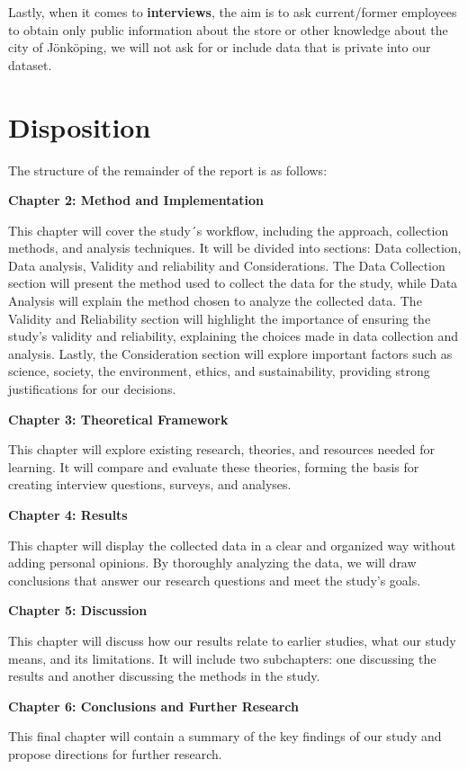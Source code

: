 Lastly, when it comes to \textbf{interviews}, the aim is to ask current/former employees to obtain only public information about the store or other knowledge about the city of Jönköping, we will not ask for or include data that is private into our dataset. 

\section{Disposition}
The structure of the remainder of the report is as follows: 

\textbf{Chapter 2: Method and Implementation}

This chapter will cover the study´s workflow, including the approach, collection methods, and analysis techniques. It will be divided into sections: Data collection, Data analysis, Validity and reliability and Considerations. The Data Collection section will present the method used to collect the data for the study, while Data Analysis will explain the method chosen to analyze the collected data. The Validity and Reliability section will highlight the importance of ensuring the study’s validity and reliability, explaining the choices made in data collection and analysis. Lastly, the Consideration section will explore important factors such as science, society, the environment, ethics, and sustainability, providing strong justifications for our decisions.




\textbf{Chapter 3: Theoretical Framework} 

This chapter will explore existing research, theories, and resources needed for learning. It will compare and evaluate these theories, forming the basis for creating interview questions, surveys, and analyses.  

\textbf{Chapter 4: Results}

This chapter will display the collected data in a clear and organized way without adding personal opinions. By thoroughly analyzing the data, we will draw conclusions that answer our research questions and meet the study's goals.


\textbf{Chapter 5: Discussion}


This chapter will discuss how our results relate to earlier studies, what our study means, and its limitations. It will include two subchapters: one discussing the results and another discussing the methods in the study.  

 
\textbf{Chapter 6: Conclusions and Further Research}

This final chapter will contain a summary of the key findings of our study and propose directions for further research.  